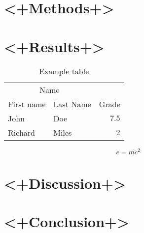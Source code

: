 \documentclass{article}
\begin{document}

\section{<+Methods+>}


\section{<+Results+>}

\begin{table}[H]
\caption{Example table}
\centering
\begin{tabular}{llr}
\toprule
\multicolumn{2}{c}{Name} \\
\cmidrule(r){1-2}
First name & Last Name & Grade \\
\midrule
John & Doe & $7.5$ \\
Richard & Miles & $2$ \\
\bottomrule
\end{tabular}
\end{table}



\lipsum[5] %

\begin{equation}
\label{eq:emc}
e = mc^2
\end{equation}

\lipsum[6] %


\section{<+Discussion+>}

\section{<+Conclusion+>}







\end{document}

